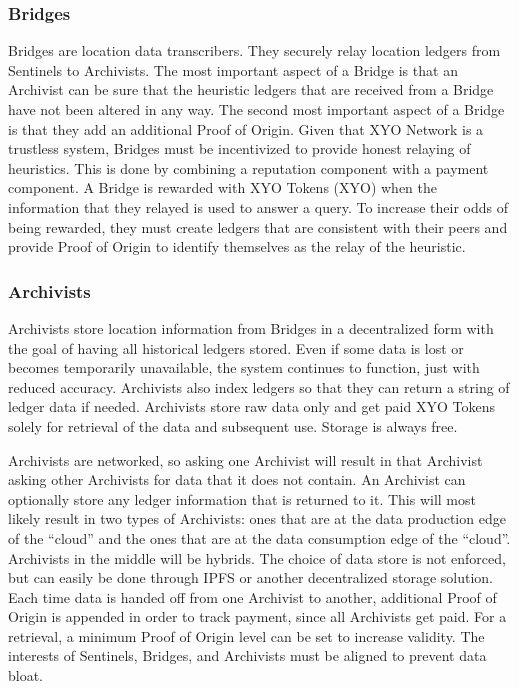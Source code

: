 \documentclass{article}
\begin{document}
\subsubsection{Bridges}

Bridges are location data transcribers. They securely relay location ledgers from Sentinels to Archivists. The most important aspect of a Bridge is that an Archivist can be sure that the heuristic ledgers that are received from a Bridge have not been altered in any way. The second most important aspect of a Bridge is that they add an additional Proof of Origin. Given that XYO Network is a trustless system, Bridges must be incentivized to provide honest relaying of heuristics. This is done by combining a reputation component with a payment component. A Bridge is rewarded with XYO Tokens (XYO) when the information that they relayed is used to answer a query. To increase their odds of being rewarded, they must create ledgers that are consistent with their peers and provide Proof of Origin to identify themselves as the relay of the heuristic.

\subsubsection{Archivists}

Archivists store location information from Bridges in a decentralized form with the goal of having all historical ledgers stored. Even if some data is lost or becomes temporarily unavailable, the system continues to function, just with reduced accuracy. Archivists also index ledgers so that they can return a string of ledger data if needed. Archivists store raw data only and get paid XYO Tokens solely for retrieval of the data and subsequent use. Storage is always free.

Archivists are networked, so asking one Archivist will result in that Archivist asking other Archivists for data that it does not contain. An Archivist can optionally store any ledger information that is returned to it. This will most likely result in two types of Archivists: ones that are at the data production edge of the ``cloud'' and the ones that are at the data consumption edge of the ``cloud''. Archivists in the middle will be hybrids. The choice of data store is not enforced, but can easily be done through IPFS or another decentralized storage solution. Each time data is handed off from one Archivist to another, additional Proof of Origin is appended in order to track payment, since all Archivists get paid. For a retrieval, a minimum Proof of Origin level can be set to increase validity. The interests of Sentinels, Bridges, and Archivists must be aligned to prevent data bloat.
\end{document}
